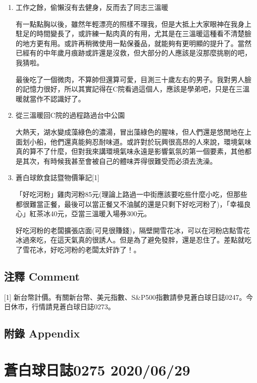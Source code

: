 \documentclass[a5paper, 11pt
]{book}
\begin{document}
\begin{enumerate}
\def\labelenumi{\arabic{enumi}.}
\item
  工作之餘，偷懶沒有去健身，反而去了同志三溫暖

  有一點點胸以後，雖然年輕漂亮的照樣不理我，但是大抵上大家眼神在我身上駐足的時間變長了，或許練一點肉真的有用，尤其是在三溫暖這種看不清楚臉的地方更有用。或許再稍微使用一點保養品，就能夠有更明顯的提升了。當然已經有的中年歲月痕跡或許還是沒救，但大部分的人應該是沒那麼挑剔的吧，我猜啦。

  最後吃了一個微肉，不算帥但還算可愛，目測三十歲左右的男子。我對男人臉的記憶力很好，所以其實記得在C院看過這個人，應該是學弟吧，只是在三溫暖就當作不認識好了。
\item
  從三溫暖回C院的過程路過台中公園

  大熱天，湖水變成藻綠色的濃湯，冒出藻綠色的腥味，但人們還是悠閒地在上面划小船，他們還真能夠忍耐味道。或許對於玩興很高昂的人來說，環境氣味真的算不了什麼，但對我來講環境氣味永遠是影響氣氛的第一個要素，其他都是其次，有時候我甚至會被自己的體味弄得很難受而必須去洗澡。
\item
  蒼白球飲食誌暨物價筆記{[}1{]}

  「好吃河粉」雞肉河粉85元(理論上路過一中街應該要吃些什麼小吃，但那些都很難當正餐，最後可以當正餐又不油膩的還是只剩下好吃河粉了)，「幸福良心」紅茶冰40元，亞當三溫暖入場券300元。

  好吃河粉的老闆擴張店面(可見很賺錢)，隔壁開雪花冰，可以在河粉店點雪花冰過來吃，在這天氣真的很誘人。但是為了避免發胖，還是忍住了。差點就吃了雪花冰，好吃河粉的老闆太奸詐了！。
\end{enumerate}

\hypertarget{ux6ce8ux91cb-comment-23}{%
\subsection{注釋 Comment}\label{ux6ce8ux91cb-comment-23}}

{[}1{]}
新台幣計價。有關新台幣、美元指數、S\&P500指數請參見蒼白球日誌0247。今日休市，行情請見蒼白球日誌0273。

\hypertarget{ux9644ux9304-appendix-23}{%
\subsection{附錄 Appendix}\label{ux9644ux9304-appendix-23}}

\hypertarget{ux84bcux767dux7403ux65e5ux8a8c0275-20200629}{%
\section{蒼白球日誌0275
2020/06/29}\label{ux84bcux767dux7403ux65e5ux8a8c0275-20200629}}
\end{document}
